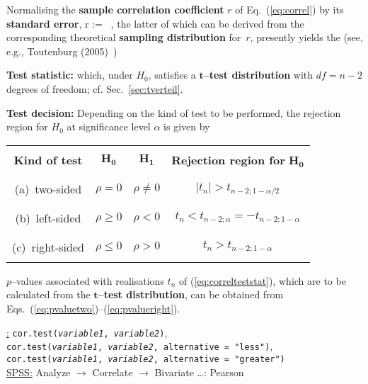 \medskip
\noindent
Normalising the \textbf{sample correlation coefficient} $r$ of 
Eq.~(\ref{eq:correl}) by its \textbf{standard error},
%
\be
{}r := \ ,
\ee
%
the latter of which can be derived from the corresponding 
theoretical \textbf{sampling distribution} for~$r$, presently
yields the (see, e.g., Toutenburg (2005)~)

\medskip
\noindent
\textbf{Test statistic:}
%
\be
{}
\ee
%
which, under $H_{0}$, satisfies a $\boldsymbol{t}$\textbf{--test
distribution} with $df=n-2$ degrees of freedom; cf.
Sec.~\ref{sec:tverteil}.

\medskip
\noindent
\textbf{Test decision:} Depending on the kind of test to be 
performed, the rejection region for $H_{0}$ at significance level 
$\alpha$ is given by
%
\begin{center}
\begin{tabular}[h]{c|c|c|c}
 & & & \\
\textbf{Kind of test} & $\boldsymbol{H_{0}}$ &
$\boldsymbol{H_{1}}$ &
\textbf{Rejection region for} $\boldsymbol{H_{0}}$ \\
 & & & \\
\hline
 & & & \\
(a)~two-sided & $\rho=0$ & $\rho \neq 0$ &
$|t_{n}|>t_{n-2;1-\alpha/2}$ \\
 & & & \\
\hline
 & & & \\
(b)~left-sided & $\rho \geq 0$ & $\rho<0$ &
$t_{n}<t_{n-2;\alpha}=-t_{n-2;1-\alpha}$ \\
 & & & \\
\hline
 & & & \\
(c)~right-sided & $\rho \leq 0$ & $\rho>0$ &
$t_{n}>t_{n-2;1-\alpha}$ \\
 & & &
\end{tabular}
\end{center}
%
$p$--values associated with realisations $t_{n}$ of 
(\ref{eq:correlteststat}), which are to be calculated from the
$\boldsymbol{t}$\textbf{--test distribution}, can  be obtained from 
Eqs.~(\ref{eq:pvaluetwo})--(\ref{eq:pvalueright}).

\medskip
\noindent
\underline{\R:} \texttt{cor.test(\textit{variable1},
\textit{variable2})}, \\
\texttt{cor.test(\textit{variable1}, \textit{variable2}, 
alternative = "less")}, \\
\texttt{cor.test(\textit{variable1}, \textit{variable2}, 
alternative = "greater")} \\
\underline{SPSS:} Analyze $\rightarrow$ Correlate
$\rightarrow$ Bivariate \ldots: Pearson

